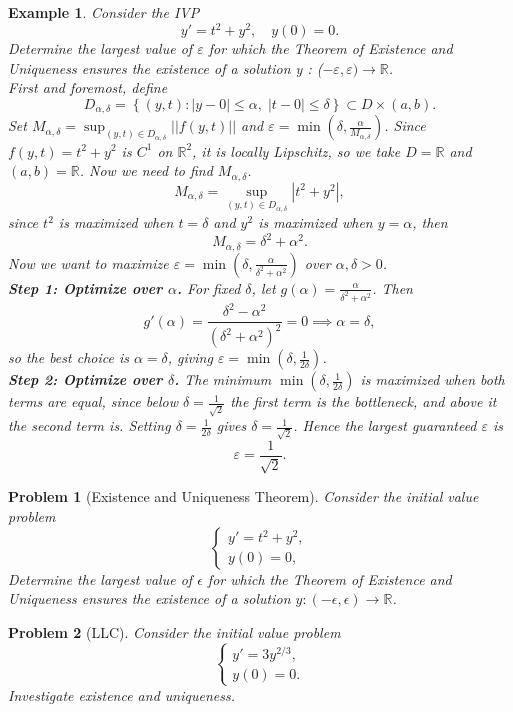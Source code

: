 \documentclass{article}
\newtheorem{problem}{Problem}
\newtheorem*{example}{Example}
\newcommand{\R}{\mathbb{R}}
\begin{document}
\begin{example}
    Consider the IVP
    \[y' = t^2+y^2, \quad y(0) = 0.\]
    Determine the largest value of $\varepsilon$ for which the Theorem of Existence and Uniqueness ensures the existence of a solution y : ($-\varepsilon, \varepsilon) \to \R$.\\
    First and foremost, define
    \[D_{\alpha,\delta} = \left\{(y,t): |y-0| \leq \alpha,\; |t-0| \leq \delta\right\}\subset D \times (a,b).\]
    Set $M_{\alpha,\delta} = \sup_{(y,t) \in D_{\alpha,\delta}} ||f(y,t)||$ and $\varepsilon = \min\!\left(\delta, \frac{\alpha}{M_{\alpha,\delta}}\right)$. Since $f(y,t) = t^2 + y^2$ is $C^1$ on $\R^2$, it is locally Lipschitz, so we take $D = \R$ and $(a,b) = \R$. Now we need to find $M_{\alpha,\delta}$.
    \[M_{\alpha, \delta} = \sup_{(y,t) \in D_{\alpha,\delta}} |t^2+y^2|,\]
    since $t^2$ is maximized when $t=\delta$ and $y^2$ is maximized when $y=\alpha$, then
    \[M_{\alpha, \delta} = \delta^2 + \alpha^2.\]
    Now we want to maximize $\varepsilon = \min\!\left(\delta, \frac{\alpha}{\delta^2 + \alpha^2}\right)$ over $\alpha, \delta > 0$.\\
    \textbf{Step 1: Optimize over $\alpha$.} For fixed $\delta$, let $g(\alpha) = \frac{\alpha}{\delta^2 + \alpha^2}$. Then
    \[g'(\alpha) = \frac{\delta^2 - \alpha^2}{(\delta^2 + \alpha^2)^2} = 0 \implies \alpha = \delta,\]
    so the best choice is $\alpha = \delta$, giving $\varepsilon = \min\!\left(\delta, \frac{1}{2\delta}\right)$.\\
    \textbf{Step 2: Optimize over $\delta$.} The minimum $\min\!\left(\delta, \frac{1}{2\delta}\right)$ is maximized when both terms are equal, since below $\delta = \frac{1}{\sqrt{2}}$ the first term is the bottleneck, and above it the second term is. Setting $\delta = \frac{1}{2\delta}$ gives $\delta = \frac{1}{\sqrt{2}}$. Hence the largest guaranteed $\varepsilon$ is
    \[\varepsilon = \frac{1}{\sqrt{2}}.\]
\end{example}
\begin{problem}[Existence and Uniqueness Theorem]
    Consider the initial value problem
    \[\begin{cases}y' = t^2+y^2, \\ y(0) = 0,\end{cases}\]
    Determine the largest value of $\epsilon$ for which the Theorem of Existence and Uniqueness ensures the existence of a solution $y: (-\epsilon,\epsilon) \to \R$.
\end{problem}
\begin{problem}[LLC]
    Consider the initial value problem
    \[\begin{cases}y' = 3y^{2/3}, \\ y(0) = 0.\end{cases}\]
    Investigate existence and uniqueness.
\end{problem}
\end{document}
